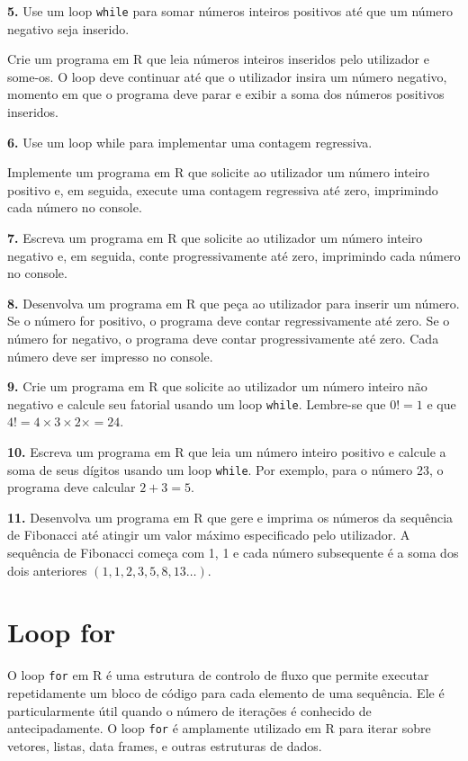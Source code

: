\documentclass[
]{book}
\begin{document}
\textbf{5.} Use um loop \texttt{while} para somar números inteiros positivos até que
um número negativo seja inserido.

Crie um programa em R que leia números inteiros inseridos pelo
utilizador e some-os. O loop deve continuar até que o utilizador insira
um número negativo, momento em que o programa deve parar e exibir a soma
dos números positivos inseridos.

\textbf{6.} Use um loop while para implementar uma contagem regressiva.

Implemente um programa em R que solicite ao utilizador um número inteiro
positivo e, em seguida, execute uma contagem regressiva até zero,
imprimindo cada número no console.

\textbf{7.} Escreva um programa em R que solicite ao utilizador um número
inteiro negativo e, em seguida, conte progressivamente até zero,
imprimindo cada número no console.

\textbf{8.} Desenvolva um programa em R que peça ao utilizador para inserir
um número. Se o número for positivo, o programa deve contar
regressivamente até zero. Se o número for negativo, o programa deve
contar progressivamente até zero. Cada número deve ser impresso no
console.

\textbf{9.} Crie um programa em R que solicite ao utilizador um número
inteiro não negativo e calcule seu fatorial usando um loop \texttt{while}.
Lembre-se que \(0! = 1\) e que \(4! = 4\times 3\times 2\times  = 24\).

\textbf{10.} Escreva um programa em R que leia um número inteiro positivo e
calcule a soma de seus dígitos usando um loop \texttt{while}. Por exemplo, para
o número 23, o programa deve calcular \(2+3 = 5\).

\textbf{11.} Desenvolva um programa em R que gere e imprima os números da
sequência de Fibonacci até atingir um valor máximo especificado pelo
utilizador. A sequência de Fibonacci começa com 1, 1 e cada número
subsequente é a soma dos dois anteriores
\((1, 1, 2, 3, 5, 8, 13 \ldots)\).

\chapter{Loop for}\label{loop-for}

O loop \texttt{for} em R é uma estrutura de controlo de fluxo que permite
executar repetidamente um bloco de código para cada elemento de uma
sequência. Ele é particularmente útil quando o número de iterações é
conhecido de antecipadamente. O loop \texttt{for} é amplamente utilizado em R
para iterar sobre vetores, listas, data frames, e outras estruturas de
dados.
\end{document}

